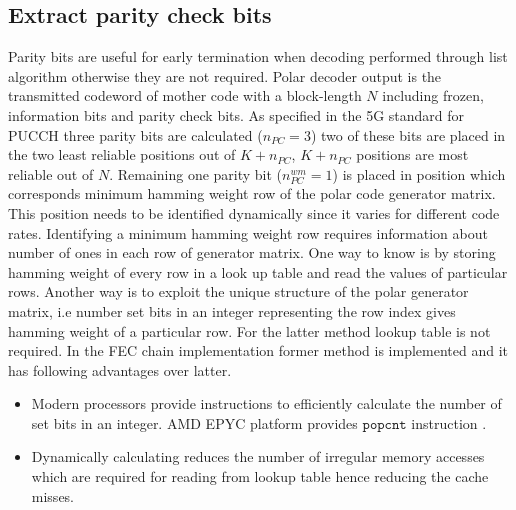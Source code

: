 




\subsection{Extract parity check bits}
Parity bits are useful for early termination when decoding performed through list algorithm otherwise they are not required. Polar decoder output is the transmitted codeword of mother code with a block-length $N$ including frozen, information bits and parity check bits. As specified in the 5G standard \cite{3gpp.38.212} for PUCCH three parity bits are calculated ($n_{PC} = 3$) two of these bits are placed in the two least reliable positions out of $K+n_{PC}$, $K+n_{PC}$ positions are most reliable out of $N$. Remaining one parity bit ($ n_{PC}^{wm} = 1 $) is placed in position which corresponds minimum hamming weight row of the polar code generator matrix. This position needs to be identified dynamically since it varies for different code rates. Identifying a minimum hamming weight row requires information about number of ones in each row of generator matrix. One way to know is by storing hamming weight of every row in a look up table and read the values of particular rows. Another way is to exploit the unique structure of the polar generator matrix, i.e number set bits in an integer representing the row index gives hamming weight of a particular row. For the latter method lookup table is not required. In the FEC chain implementation former method is implemented and it has following advantages over latter.

\begin{itemize}  
	\item Modern processors provide instructions to efficiently calculate the number of set bits in an integer. AMD EPYC platform provides $\mathtt{popcnt}$ instruction \cite{AgnerFog}.
	\item Dynamically calculating reduces the number of irregular memory accesses which are required for reading from lookup table hence reducing the cache misses.
\end{itemize}


